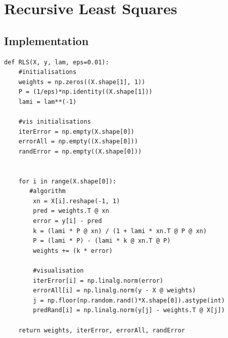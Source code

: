 \section{Recursive Least Squares}
\subsection{Implementation}
\begin{listing}[H]
    \begin{verbatim}
def RLS(X, y, lam, eps=0.01):
    #initialisations
    weights = np.zeros((X.shape[1], 1))
    P = (1/eps)*np.identity((X.shape[1]))
    lami = lam**(-1)

    #vis initialisations
    iterError = np.empty(X.shape[0])
    errorAll = np.empty((X.shape[0]))
    randError = np.empty((X.shape[0]))
    

    for i in range(X.shape[0]):
       #algorithm
        xn = X[i].reshape(-1, 1)
        pred = weights.T @ xn 
        error = y[i] - pred
        k = (lami * P @ xn) / (1 + lami * xn.T @ P @ xn)
        P = (lami * P) - (lami * k @ xn.T @ P)  
        weights += (k * error)
        
        #visualisation
        iterError[i] = np.linalg.norm(error)
        errorAll[i] = np.linalg.norm(y - X @ weights)
        j = np.floor(np.random.rand()*X.shape[0]).astype(int)
        predRand[i] = np.linalg.norm(y[j] - weights.T @ X[j])
        
    return weights, iterError, errorAll, randError
    \end{verbatim}
\end{listing}

